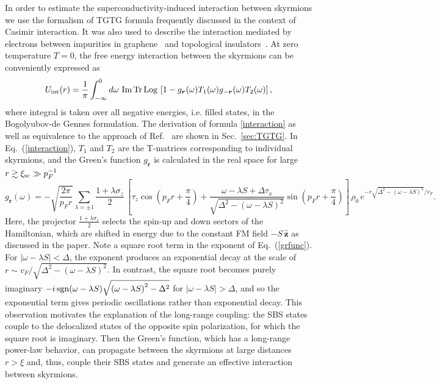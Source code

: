 \documentclass[twocolumn,showpacs,floatfix,longbibliography]{revtex4-1}
\begin{document}
\begin{widetext}
In order to estimate the superconductivity-induced interaction between skyrmions we use the formalism of TGTG formula frequently discussed in the context of Casimir interaction. It was also used to describe the interaction mediated by electrons between impurities in graphene~\cite{Shytov2009} and topological insulators~\cite{Abanin2011}. At zero temperature $T=0$, the free energy interaction between the skyrmions can be conveniently expressed as  
\begin{equation}
	U_{\rm int}(r) = \frac{1}{\pi}\int_{-\infty}^0 d\omega\,\, {\rm Im\,Tr\, Log\,} \left[ 1- g_{\bm r}(\omega) T_1(\omega) g_{-\bm r}(\omega) T_2(\omega) \right],
	\label{interaction}
\end{equation}
where integral is taken over all negative energies, i.e. filled states, in the Bogolyubov-de Gennes formulation. The derivation of formula \ref{interaction} as well as equivalence to the approach of Ref.~\cite{Yao2014} are shown in Sec.~\ref{sec:TGTG}. In Eq.~(\ref{interaction}), $T_1$ and $T_2$ are the T-matrices corresponding to individual skyrmions, and the Green's function $g_{\bm r}$ is calculated in the real space for large $r\gtrsim\xi_{\rm sc}\gg p_F^{-1}$ 
\begin{equation}
	g_{\bm r}(\omega) = - \sqrt{\frac{2\pi}{p_Fr}}\sum_{\lambda = \pm 1} \frac{1+\lambda\sigma_z}{2}\,\left[ \tau_z\cos\left( p_Fr+\frac{\pi}{4} \right) +\frac{\omega-\lambda S+\Delta\tau_x}{\sqrt{\Delta^2-\left( \omega-\lambda S \right)^2}}\sin\left( p_Fr+\frac{\pi}{4} \right) \right]\, \rho_0\, e^{-r\sqrt{\Delta^2-\left( \omega-\lambda S \right)^2}/v_F}.
	\label{grfunc}
\end{equation}
Here, the projector $ \frac{1+\lambda\sigma_z}{2}$ selects the spin-up and down sectors of the Hamiltonian, which are shifted in energy due to the constant FM field $-S\,\hat{\bm z}$ as discussed in the paper. Note a square root term in the exponent of Eq.~(\ref{grfunc}). For $|\omega-\lambda S|<\Delta$, the exponent produces an exponential decay at the scale of $r \sim v_F/\sqrt{\Delta^2-\left( \omega-\lambda S \right)^2}$. In contrast, the square root becomes purely imaginary $-i\,{\rm sgn}(\omega-\lambda S) \sqrt{\left( \omega-\lambda S \right)^2-\Delta^2}$ for $|\omega-\lambda S|>\Delta$, and so the exponential term gives periodic oscillations rather than exponential decay. This observation motivates the explanation of the long-range coupling: the SBS states couple to the delocalized states of the opposite spin polarization, for which the square root is imaginary. Then the Green's function, which has a long-range power-law behavior, can propagate between the skyrmions at large distances $r>\xi$ and, thus, couple their SBS states and generate an effective interaction between skyrmions. 


\end{widetext}
\end{document}
